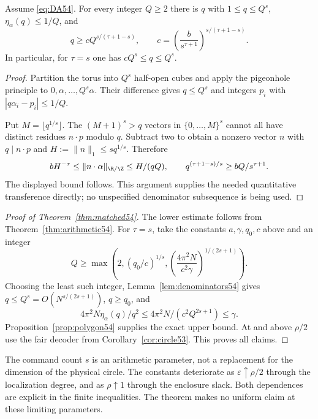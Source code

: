 \begin{lemma}\label{lem:denominators54}
Assume \eqref{eq:DA54}. For every integer $Q\ge2$ there is $q$ with $1\le q\le Q^s$, $\eta_\alpha(q)\le1/Q$, and
\[
 q\ge c Q^{s/(\tau+1-s)},\qquad
 c=\left(\frac{b}{s^{\tau+1}}\right)^{s/(\tau+1-s)}.
\]
In particular, for $\tau=s$ one has $cQ^s\le q\le Q^s$.
\end{lemma}
\begin{proof}
Partition the torus into $Q^s$ half-open cubes and apply the pigeonhole principle to $0,\alpha,\ldots,Q^s\alpha$. Their difference gives $q\le Q^s$ and integers $p_i$ with $|q\alpha_i-p_i|\le1/Q$.

Put $M=\lfloor q^{1/s}\rfloor$. The $(M+1)^s>q$ vectors in $\{0,\ldots,M\}^s$ cannot all have distinct residues $n\cdot p$ modulo $q$. Subtract two to obtain a nonzero vector $n$ with $q\mid n\cdot p$ and $H:=\|n\|_1\le s q^{1/s}$. Therefore
\[
 bH^{-\tau}\le\|n\cdot\alpha\|_{\R/\Z}
 \le H/(qQ),\qquad
 q^{(\tau+1-s)/s}\ge bQ/s^{\tau+1}.
\]
The displayed bound follows. This argument supplies the needed quantitative transference directly; no unspecified denominator subsequence is being used.
\end{proof}

\begin{proof}[Proof of Theorem~\ref{thm:matched54}]
The lower estimate follows from Theorem~\ref{thm:arithmetic54}. For $\tau=s$, take the constants $a,\gamma,q_0,c$ above and an integer
\[
 Q\ge\max\left(2,(q_0/c)^{1/s},
                \left(\frac{4\pi^2N}{c^2\gamma}\right)^{1/(2s+1)}\right).
\]
Choosing the least such integer, Lemma~\ref{lem:denominators54} gives $q\le Q^s=O(N^{s/(2s+1)})$, $q\ge q_0$, and
\[
 4\pi^2N\eta_\alpha(q)/q^2
 \le4\pi^2N/(c^2Q^{2s+1})\le\gamma.
\]
Proposition~\ref{prop:polygon54} supplies the exact upper bound. At and above $\rho/2$ use the fair decoder from Corollary~\ref{cor:circle53}. This proves all claims.
\end{proof}
The command count $s$ is an arithmetic parameter, not a replacement for the dimension of the physical circle. The constants deteriorate as $\varepsilon\uparrow\rho/2$ through the localization degree, and as $\rho\uparrow1$ through the enclosure slack. Both dependences are explicit in the finite inequalities. The theorem makes no uniform claim at these limiting parameters.
